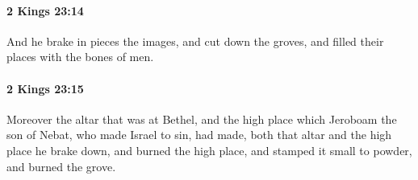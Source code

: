 		\paragraph{2 Kings 23:14} %
			\label{2KINGS-23-14}

			And he brake in pieces the images, and cut down the groves, and filled their places with the bones of men.


		\paragraph{2 Kings 23:15} %
			\label{2KINGS-23-15}

			Moreover the altar that was at Bethel, and the high place which Jeroboam the son of Nebat, who made Israel to sin, had made, both that altar and the high place he brake down, and burned the high place, and stamped it small to powder, and burned the grove.


